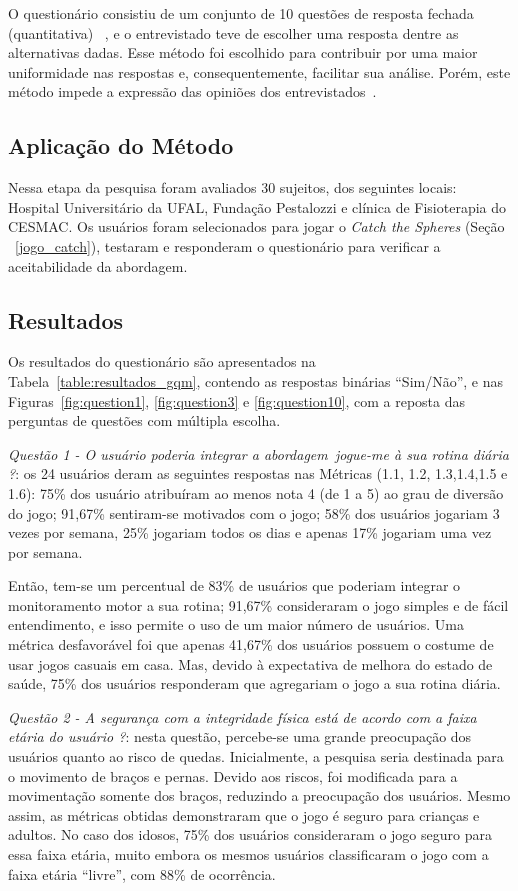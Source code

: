 O questionário consistiu de um conjunto de 10 questões de resposta fechada (quantitativa) ~\cite{elicquest05}, e o entrevistado teve de escolher uma resposta dentre as alternativas dadas. Esse método foi escolhido para contribuir por uma maior uniformidade nas respostas e, consequentemente, facilitar sua análise. Porém, este método impede a expressão das opiniões dos entrevistados~\cite{elicquest05}. 


\subsection{Aplicação do Método}
Nessa etapa da pesquisa foram avaliados 30 sujeitos, dos seguintes locais: Hospital Universitário da UFAL, Fundação Pestalozzi e clínica de Fisioterapia do CESMAC. Os usuários foram selecionados para jogar o \emph{Catch the Spheres} (Seção ~\ref{jogo_catch}), testaram e responderam o questionário para verificar a aceitabilidade da abordagem. 


\subsection{Resultados}
Os resultados do questionário são apresentados na Tabela~\ref{table:resultados_gqm}, contendo as respostas binárias ``Sim/Não'', e nas Figuras~\ref{fig:question1}, \ref{fig:question3} e \ref{fig:question10}, com a reposta das perguntas de questões com múltipla escolha.

\textit{Questão 1 - O usuário poderia integrar a abordagem~\ac{jogue-me} à sua rotina diária ?}: os 24 usuários deram as seguintes respostas nas Métricas (1.1, 1.2, 1.3,1.4,1.5 e 1.6): 75\% dos usuário atribuíram ao menos nota 4 (de 1 a 5) ao grau de diversão do jogo; 91,67\% sentiram-se motivados com o jogo; 58\% dos usuários jogariam 3 vezes por semana, 25\% jogariam todos os dias e apenas 17\% jogariam uma vez por semana. 

Então, tem-se um percentual de 83\% de usuários que poderiam integrar o monitoramento motor a sua rotina; 91,67\% consideraram o jogo simples e de fácil entendimento, e isso permite o uso de um maior número de usuários. Uma métrica desfavorável foi que apenas 41,67\% dos usuários possuem o costume de usar jogos casuais em casa. Mas, devido à expectativa de melhora do estado de saúde, 75\% dos usuários responderam que agregariam o jogo a sua rotina diária.

\textit{Questão 2 - A segurança com a integridade física está de acordo com a faixa etária do usuário
?}: nesta questão, percebe-se uma grande preocupação dos usuários quanto ao risco de quedas. Inicialmente, a pesquisa seria destinada para o movimento de braços e pernas. Devido aos riscos, foi modificada para a movimentação somente dos braços, reduzindo a preocupação dos usuários. Mesmo assim, as métricas obtidas demonstraram que o jogo é seguro para crianças e adultos. No caso dos idosos, 75\% dos usuários consideraram o jogo seguro para essa faixa etária, muito embora os mesmos usuários classificaram o jogo com a faixa etária ``livre'', com 88\% de ocorrência.

